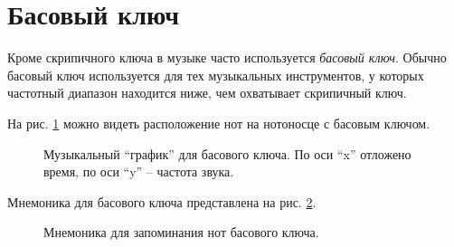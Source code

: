 \documentclass[../sparc.tex]{subfiles}
\begin{document}
\section{Басовый ключ}

Кроме скрипичного ключа в музыке часто используется \emph{басовый ключ}.  Обычно
басовый ключ используется для тех музыкальных инструментов, у которых частотный
диапазон находится ниже, чем охватывает скрипичный ключ.

На рис. \ref{fig:lilypond-bass-clef} можно видеть расположение нот на нотоносце
с басовым ключом.

\begin{figure}[ht]
  \centering
  \caption{Музыкальный ``график'' для басового ключа.  По оси ``x'' отложено
    время, по оси ``y'' -- частота звука.}
  \label{fig:lilypond-bass-clef}
\end{figure}

Мнемоника для басового ключа представлена на
рис. \ref{fig:lilypond-bass-clef-mnemonic}.

\begin{figure}[ht]
  \centering
  \caption{Мнемоника для запоминания нот басового ключа.}
  \label{fig:lilypond-bass-clef-mnemonic}
\end{figure}
\end{document}
